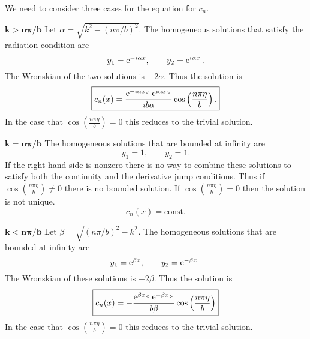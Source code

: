 \begin{Example}
  We need to consider three cases for the equation for $c_n$.
  \begin{description}
  \item{$\mathbf{k \boldsymbol{>} n \boldsymbol{\pi} / b}$}
    Let $\alpha = \sqrt{k^2-(n \pi/b)^2}$.
    The homogeneous solutions that satisfy the radiation condition are
    \[
    y_1 = \mathop{\mathrm{e}}\nolimits^{-\imath \alpha x}, \qquad y_2 = \mathop{\mathrm{e}}\nolimits^{\imath \alpha x}.
    \]
    The Wronskian of the two solutions is $\imath 2 \alpha$.  Thus the solution is
    \[
    \boxed{
      c_n(x) = \frac{\mathop{\mathrm{e}}\nolimits^{- \imath \alpha x_<} \mathop{\mathrm{e}}\nolimits^{\imath \alpha x_>}}{\imath b \alpha} 
      \cos\left(\frac{n\pi \eta}{b}\right).
      }
    \]
    In the case that $\cos\left(\frac{n\pi \eta}{b}\right) = 0$ this reduces to 
    the trivial solution.
  \item{$\mathbf{k \boldsymbol{=} n \boldsymbol{\pi} / b}$}
    The homogeneous solutions that are bounded at infinity are
    \[
    y_1 = 1, \qquad y_2 = 1.
    \]
    If the right-hand-side is nonzero there is no way to combine these solutions
    to satisfy both the continuity and the derivative jump conditions.
    Thus if $\cos\left(\frac{n\pi \eta}{b}\right) \neq 0$ there is no bounded 
    solution.  If $\cos\left(\frac{n\pi \eta}{b}\right) = 0$ then the solution 
    is not unique.
    \[
    c_n(x) = \mathrm{const}.
    \]
  \item{$\mathbf{k \boldsymbol{<} n \boldsymbol{\pi} / b}$}
    Let $\beta = \sqrt{(n \pi / b)^2 - k^2}$.
    The homogeneous solutions that are bounded at infinity are
    \[
    y_1 = \mathop{\mathrm{e}}\nolimits^{\beta x}, \qquad y_2 = \mathop{\mathrm{e}}\nolimits^{-\beta x}.
    \]
    The Wronskian of these solutions is $-2 \beta$.  Thus the solution is
    \[
    \boxed{
      c_n(x) = -\frac{\mathop{\mathrm{e}}\nolimits^{\beta x_<} \mathop{\mathrm{e}}\nolimits^{-\beta x_>}}{b \beta} 
      \cos\left(\frac{n \pi \eta}{b} \right)
      }
    \]
    In the case that $\cos\left(\frac{n\pi \eta}{b}\right) = 0$ this reduces to 
    the trivial solution.
  \end{description}
\end{Example}










